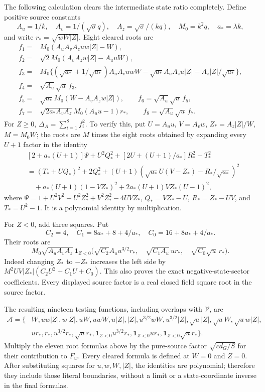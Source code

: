 \documentclass[11pt]{article}
\begin{document}
The following calculation clears the intermediate state ratio
completely. Define positive source constants
\[
 A_u=1/k,\quad A_v=1/(\sqrt\sigma q),\quad
 A_z=\sqrt\sigma/(kq),\quad M_0=k^2q,\quad a_*=\lambda k,
\]
and write $r_* =\sqrt{wW|Z|}$. Eight cleared roots are
\[
\begin{split}
 f_1={}&M_0(A_uA_vA_zuw|Z|-W),\\
 f_2={}&\sqrt2 M_0(A_vA_zw|Z|-A_uuW),\\
 f_3={}&M_0\{(\sqrt{a_*}+1/\sqrt{a_*})A_uA_vuwW
                   -\sqrt{a_*}A_uA_zu|Z|-A_z|Z|/\sqrt{a_*}\},\\
 f_4={}&\sqrt{A_u}\sqrt u\,f_3,\\
 f_5={}&\sqrt{a_*}M_0(W-A_vA_zw|Z|),\qquad
 f_6=\sqrt{A_u}\sqrt u\,f_5,\\
 f_7={}&\sqrt{2a_*A_vA_z}M_0(A_uu-1)r_*,\qquad
 f_8=\sqrt{A_u}\sqrt u\,f_7.
\end{split}
\]
For $Z\ge0$, $\Delta_A=\sum_{i=1}^8f_i^2$. To verify this,
put $U=A_uu$, $V=A_vw$, $Z_*=A_z|Z|/W$, $M=M_0W$;
the roots are $M$ times the eight roots obtained by expanding
every $U+1$ factor in the identity
\begin{align*}
 &[2+a_*(U+1)]\Psi+U^2Q_*^2
       +[2U+(U+1)/a_*]R_*^2-T_*^2\\
 &=(T_*+UQ_*)^2+2Q_*^2
 +(U+1)(\sqrt{a_*}U(V-Z_*)-R_*/\sqrt{a_*})^2\\
 &\quad+a_*(U+1)(1-VZ_*)^2
                         +2a_*(U+1)VZ_*(U-1)^2,
\end{align*}
where $\Psi=1+U^2V^2+U^2Z_*^2+V^2Z_*^2-4UVZ_*$,
$Q_*=VZ_*-U$, $R_*=Z_*-UV$, and $T_*=U^2-1$.
It is a polynomial identity by multiplication.

For $Z<0$, add three squares. Put
\[
 C_2=4,\quad C_1=8a_*+8+4/a_*,\quad C_0=16+8a_*+4/a_*.
\]
Their roots are
\[
 M_0\sqrt{A_uA_vA_z}\,\boldsymbol1_{Z<0}
 \bigl(\sqrt{C_2}A_u u^{3/2}r_*,\quad
       \sqrt{C_1A_u}\,u r_*,\quad
       \sqrt{C_0}\sqrt u\,r_*\bigr).
\]
Indeed changing $Z_*$ to $-Z_*$ increases the left side by
$M^2UV|Z_*|(C_2U^2+C_1U+C_0)$. This also proves the exact
negative-state-sector coefficients. Every displayed source
factor is a real closed field square root in the source factor.

The resulting nineteen testing functions, including overlaps
with $\mathcal V$, are
\[
\begin{split}
 \mathcal A=\{&W,uw|Z|,w|Z|,uW,uwW,u|Z|,|Z|,
 u^{3/2}wW,u^{3/2}|Z|,\sqrt u|Z|,\sqrt uW,\sqrt u w|Z|,\\
 &ur_*,r_*,u^{3/2}r_*,\sqrt u r_*,
 \boldsymbol1_{Z<0}u^{3/2}r_*,
 \boldsymbol1_{Z<0}ur_*,\boldsymbol1_{Z<0}\sqrt u r_*\}.
\end{split}
\]
Multiply the eleven root formulas above by the pure-source factor
$\sqrt{cd_G/S}$ for their contribution to $F_w$.
Every cleared formula is defined at $W=0$ and $Z=0$. After
substituting squares for $u,w,W,|Z|$, the identities are polynomial;
therefore they include those literal boundaries, without a limit
or a state-coordinate inverse in the final formulas.
\end{document}
